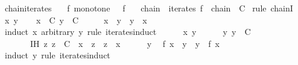 \begin{isabellebody}
\endisatagproof
{\isafoldproof}%
%
\isadelimproof
\isanewline
%
\endisadelimproof
\isanewline
{}\isamarkupfalse%
\ chain{\isacharunderscore}{\kern0pt}iterates{\isacharcolon}{\kern0pt}\isanewline
\ \ \ f{\isacharcolon}{\kern0pt}\ {\isachardoublequoteopen}monotone\ {\isacharparenleft}{\kern0pt}{\isasymle}{\isacharparenright}{\kern0pt}\ {\isacharparenleft}{\kern0pt}{\isasymle}{\isacharparenright}{\kern0pt}\ f{\isachardoublequoteclose}\isanewline
\ \ \ {\isachardoublequoteopen}chain\ {\isacharparenleft}{\kern0pt}{\isasymle}{\isacharparenright}{\kern0pt}\ {\isacharparenleft}{\kern0pt}iterates\ f{\isacharparenright}{\kern0pt}{\isachardoublequoteclose}\ {\isacharparenleft}{\kern0pt}\ {\isachardoublequoteopen}chain\ {\isacharunderscore}{\kern0pt}\ {\isacharquery}{\kern0pt}C{\isachardoublequoteclose}{\isacharparenright}{\kern0pt}\isanewline
%
\isadelimproof
%
\endisadelimproof
%
\isatagproof
{}\isamarkupfalse%
\ {\isacharparenleft}{\kern0pt}rule\ chainI{\isacharparenright}{\kern0pt}\isanewline
\ \ \isamarkupfalse%
\ x\ y\isanewline
\ \ \isamarkupfalse%
\ {\isachardoublequoteopen}x\ {\isasymin}\ {\isacharquery}{\kern0pt}C{\isachardoublequoteclose}\ {\isachardoublequoteopen}y\ {\isasymin}\ {\isacharquery}{\kern0pt}C{\isachardoublequoteclose}\isanewline
\ \ \isamarkupfalse%
\ \isamarkupfalse%
\ {\isachardoublequoteopen}x\ {\isasymle}\ y\ {\isasymor}\ y\ {\isasymle}\ x{\isachardoublequoteclose}\isanewline
\ \ \isamarkupfalse%
\ {\isacharparenleft}{\kern0pt}induct\ x\ arbitrary{\isacharcolon}{\kern0pt}\ y\ rule{\isacharcolon}{\kern0pt}\ iterates{\isachardot}{\kern0pt}induct{\isacharparenright}{\kern0pt}\isanewline
\ \ \ \ \isamarkupfalse%
\ x\ y\isanewline
\ \ \ \ \isamarkupfalse%
\ y{\isacharcolon}{\kern0pt}\ {\isachardoublequoteopen}y\ {\isasymin}\ {\isacharquery}{\kern0pt}C{\isachardoublequoteclose}\isanewline
\ \ \ \ \ \ \ IH{\isacharcolon}{\kern0pt}\ {\isachardoublequoteopen}{\isasymAnd}z{\isachardot}{\kern0pt}\ z\ {\isasymin}\ {\isacharquery}{\kern0pt}C\ {\isasymLongrightarrow}\ x\ {\isasymle}\ z\ {\isasymor}\ z\ {\isasymle}\ x{\isachardoublequoteclose}\isanewline
\ \ \ \ \isamarkupfalse%
\ y\ \isamarkupfalse%
\ {\isachardoublequoteopen}f\ x\ {\isasymle}\ y\ {\isasymor}\ y\ {\isasymle}\ f\ x{\isachardoublequoteclose}\isanewline
\ \ \ \ \isamarkupfalse%
\ {\isacharparenleft}{\kern0pt}induct\ y\ rule{\isacharcolon}{\kern0pt}\ iterates{\isachardot}{\kern0pt}induct{\isacharparenright}{\kern0pt}\isanewline

\end{isabellebody}
